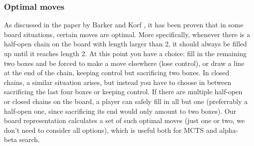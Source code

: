 \subsubsection{Optimal moves}

As discussed in the paper by Barker and Korf \cite{Barker:2012:SD:2900728.2900788}, it has been proven that in some board situations, certain moves are optimal. More specifically, whenever there is a half-open chain on the board with length larger than 2, it should always be filled up until it reaches length 2. At this point you have a choice: fill in the remaining two boxes and be forced to make a move elsewhere (lose control), or draw a line at the end of the chain, keeping control but sacrificing two boxes. In closed chains, a similar situation arises, but instead you have to choose in between sacrificing the last four boxes or keeping control. If there are multiple half-open or closed chains on the board, a player can safely fill in all but one (preferrably a half-open one, since sacrificing its end would only amount to two boxes). Our board representation calculates a set of such optimal moves (just one or two, we don't need to consider all options), which is useful both for MCTS and alpha-beta search.